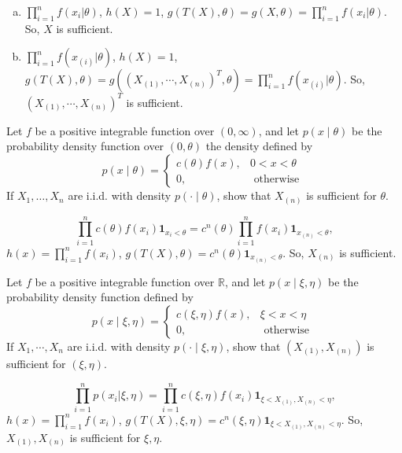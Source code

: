 \begin{solution}
    \begin{enumerate}[(a)]
        \item $\prod_{i=1}^nf(x_i|\theta)$, $h(X)=1$, $g(T(X), \theta)=g(X,\theta)=\prod_{i=1}^nf(x_i|\theta)$. So, $X$ is sufficient. 
        \item $\prod_{i=1}^nf(x_{(i)}|\theta)$, $h(X)=1$, $g(T(X), \theta)=g((X_{(1)}, \cdots,X_{(n)})^T,\theta)=\prod_{i=1}^nf(x_{(i)}|\theta)$. So, $(X_{(1)}, \cdots,X_{(n)})^T$ is sufficient. 
    \end{enumerate}
\end{solution}

\begin{ex}
    Let \(f\) be a positive integrable function over \((0, \infty)\), and let \(p(x \mid \theta)\) be the probability density function over \((0, \theta)\) the density defined by
    \[
        p(x \mid \theta)=\left\{\begin{array}{cl}
        c(\theta) f(x), & 0<x<\theta \\
        0, & \text { otherwise }
        \end{array}\right.
    \]
    If \(X_{1}, \ldots, X_{n}\) are i.i.d. with density \(p(\cdot \mid \theta)\), show that \(X_{(n)}\) is sufficient for \(\theta\). 
\end{ex}

\begin{solution}
    \[
        \prod_{i=1}^n c(\theta)f(x_i)\mathbf{1}_{x_i<\theta}=c^n(\theta)\prod_{i=1}^nf(x_i)\mathbf{1}_{x_{(n)}<\theta}, 
    \]
    $h(x)=\prod_{i=1}^nf(x_i)$, $g(T(X),\theta)=c^n(\theta)\mathbf{1}_{x_{(n)}<\theta}$. So, $X_{(n)}$ is sufficient. 
\end{solution}

\begin{ex}
    Let \(f\) be a positive integrable function over \(\mathbb{R}\), and let \(p(x \mid \xi, \eta)\) be the probability density function defined by
    \[
        p(x \mid \xi, \eta)=\left\{\begin{array}{cl}
        c(\xi, \eta) f(x), & \xi<x<\eta \\
        0, & \text { otherwise }
        \end{array}\right.
    \]
    If \(X_{1}, \cdots, X_{n}\) are i.i.d. with density \(p(\cdot \mid \xi, \eta)\), show that \(\left(X_{(1)}, X_{(n)}\right)\) is sufficient for \((\xi, \eta)\).
\end{ex}


\begin{solution}
    \[
        \prod_{i=1}^np(x_i|\xi, \eta)=\prod_{i=1}^nc(\xi, \eta) f(x_i)\mathbf{1}_{\xi<X_{(1)}, X_{(n)}<\eta}, 
    \]
    $h(x)=\prod_{i=1}^nf(x_i)$, $g(T(X),\xi,\eta)=c^n(\xi,\eta)\mathbf{1}_{\xi<X_{(1)}, X_{(n)}<\eta}$. So, $X_{(1)}, X_{(n)}$ is sufficient for $\xi,\eta$. 
\end{solution}


